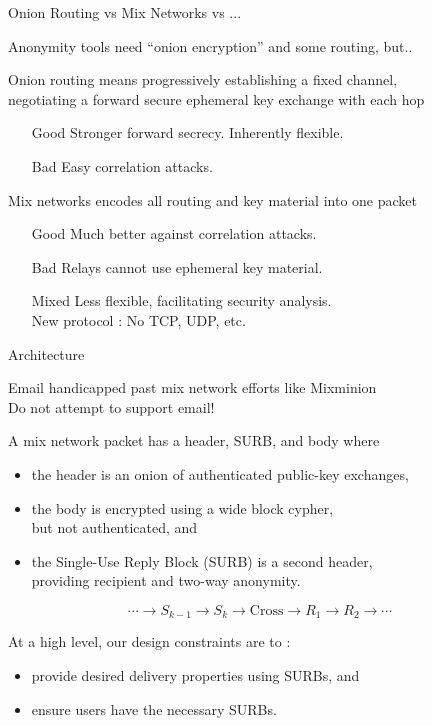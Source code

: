 \documentclass[fleqn,xcolor={usenames,dvipsnames}]{beamer}
\begin{document}
\begin{frame}[t]{Onion Routing vs Mix Networks vs ...}

Anonymity tools need ``onion encryption'' and some routing, but..

\bigskip

Onion routing means progressively establishing a fixed channel, \\
negotiating a forward secure ephemeral key exchange with each hop \\
\begin{itemize}
\item[Good] Stronger forward secrecy.  Inherently flexible.
\item[Bad] Easy correlation attacks.
\end{itemize}

\medskip

Mix networks encodes all routing and key material into one packet
\begin{itemize}
\item[Good] Much better against correlation attacks.
\item[Bad] Relays cannot use ephemeral key material. 
\item[Mixed] Less flexible, facilitating security analysis. \\
  New protocol :  No TCP, UDP, etc.
\end{itemize}

\end{frame}


\begin{frame}{Architecture}

Email handicapped past mix network efforts like Mixminion \\
 \hspace*{10pt} Do not attempt to support email!
\medskip

A mix network packet has a header, SURB, and body where
\begin{itemize}
\item the header is an onion of authenticated public-key exchanges,
\item the body is encrypted using a wide block cypher, \\
  but not authenticated, and
\item the Single-Use Reply Block (SURB) is a second header, \\
 \hspace*{2pt} providing recipient and two-way anonymity.
\end{itemize}
\[ \cdots \to S_{k-1} \to S_k \to \textrm{Cross} \to R_1 \to R_2 \to \cdots \]

\medskip
\pause

At a high level, our design constraints are to : 
\begin{itemize}
\item provide desired delivery properties using SURBs, and 
\item ensure users have the necessary SURBs.
\end{itemize}

\end{frame}
\end{document}
